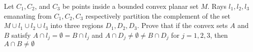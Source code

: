 Let $C_1,C_2$, and $C_3$ be points inside a bounded convex planar set $M$. Rays $l_1,l_2,l_3$ emanating from $C_1,C_2,C_3$ respectively partition the complement of the set $M \cup l_1 \cup  l_2 \cup l_3$ into three regions $D_1,D_2,D_3$. Prove that if the convex sets $A$ and $B$ satisfy $A\cap l_j  =\emptyset = B\cap l_j$ and $A\cap D_j \ne  \emptyset \ne B\cap D_j$ for $j = 1,2,3$, then $A\cap B \ne \emptyset$